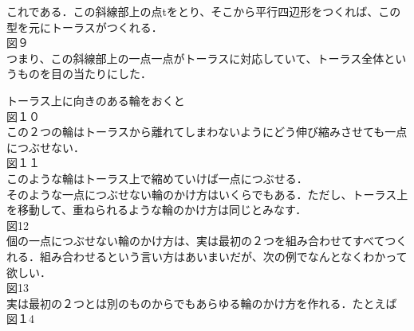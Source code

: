 これである．この斜線部上の点tをとり、そこから平行四辺形をつくれば、この型を元にトーラスがつくれる．\\

図９\\

つまり、この斜線部上の一点一点がトーラスに対応していて、トーラス全体というものを目の当たりにした．

トーラス上に向きのある輪をおくと\\

図１０\\

この２つの輪はトーラスから離れてしまわないようにどう伸び縮みさせても一点につぶせない．\\

図１１\\

このような輪はトーラス上で縮めていけば一点につぶせる．\\
そのような一点につぶせない輪のかけ方はいくらでもある．ただし、トーラス上を移動して、重ねられるような輪のかけ方は同じとみなす．\\

図12\\

個の一点につぶせない輪のかけ方は、実は最初の２つを組み合わせてすべてつくれる．組み合わせるという言い方はあいまいだが、次の例でなんとなくわかって欲しい．\\

図13\\

実は最初の２つとは別のものからでもあらゆる輪のかけ方を作れる．たとえば\\

図１4\\

